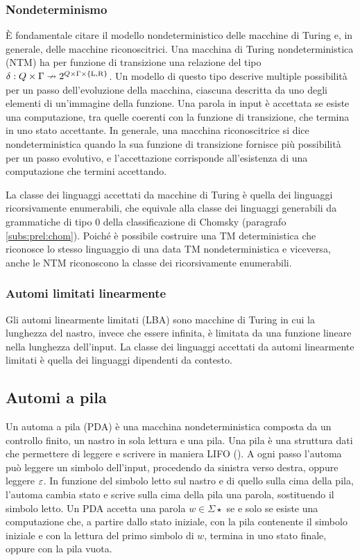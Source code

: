 \subsubsection{Nondeterminismo}
È fondamentale citare il modello nondeterministico delle macchine di Turing e, in generale, delle macchine riconoscitrici. Una macchina di Turing nondeterministica (NTM) ha per funzione di transizione una relazione del tipo $\delta:Q\times\Gamma\nrightarrow 2^{Q\times\Gamma\times\left\{ \mathrm L,\mathrm R \right\}}$. Un modello di questo tipo descrive multiple possibilità per un passo dell'evoluzione della macchina, ciascuna descritta da uno degli elementi di un'immagine della funzione. Una parola in input è accettata se esiste una computazione, tra quelle coerenti con la funzione di transizione, che termina in uno stato accettante.
In generale, una macchina riconoscitrice si dice nondeterministica quando la sua funzione di transizione fornisce più possibilità per un passo evolutivo, e l'accettazione corrisponde all'esistenza di una computazione che termini accettando.

La classe dei linguaggi accettati da macchine di Turing è quella dei linguaggi ricorsivamente enumerabili, che equivale alla classe dei linguaggi generabili da grammatiche di tipo 0 della classificazione di Chomsky (paragrafo \ref{subs:prel:chom}). Poiché è possibile costruire una TM deterministica che riconosce lo stesso linguaggio di una data TM nondeterministica e viceversa, anche le NTM riconoscono la classe dei ricorsivamente enumerabili.

\subsubsection{Automi limitati linearmente}
Gli automi linearmente limitati (LBA) sono macchine di Turing in cui la lunghezza del nastro, invece che essere infinita, è limitata da una funzione lineare nella lunghezza dell'input. La classe dei linguaggi accettati da automi linearmente limitati è quella dei linguaggi dipendenti da contesto.


\subsection{Automi a pila}\label{subs:prel:PDA}
Un automa a pila (PDA) è una macchina nondeterministica composta da un controllo finito, un nastro in sola lettura e una pila. Una pila è una struttura dati che permettere di leggere e scrivere in maniera LIFO (). A ogni passo l'automa può leggere un simbolo dell'input, procedendo da sinistra verso destra, oppure leggere $\varepsilon$. In funzione del simbolo letto sul nastro e di quello sulla cima della pila, l'automa cambia stato e scrive sulla cima della pila una parola, sostituendo il simbolo letto. Un PDA accetta una parola $w\in\Sigma\star$ se e solo se esiste una computazione che, a partire dallo stato iniziale, con la pila contenente il simbolo iniziale e con la lettura del primo simbolo di $w$, termina in uno stato finale, oppure con la pila vuota.

